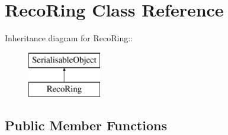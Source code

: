 \hypertarget{classRecoRing}{
\section{RecoRing Class Reference}
\label{classRecoRing}
}
Inheritance diagram for RecoRing::\begin{figure}[H]
\begin{center}
\leavevmode
\includegraphics[height=2cm]{classRecoRing}
\end{center}
\end{figure}
\subsection*{Public Member Functions}
